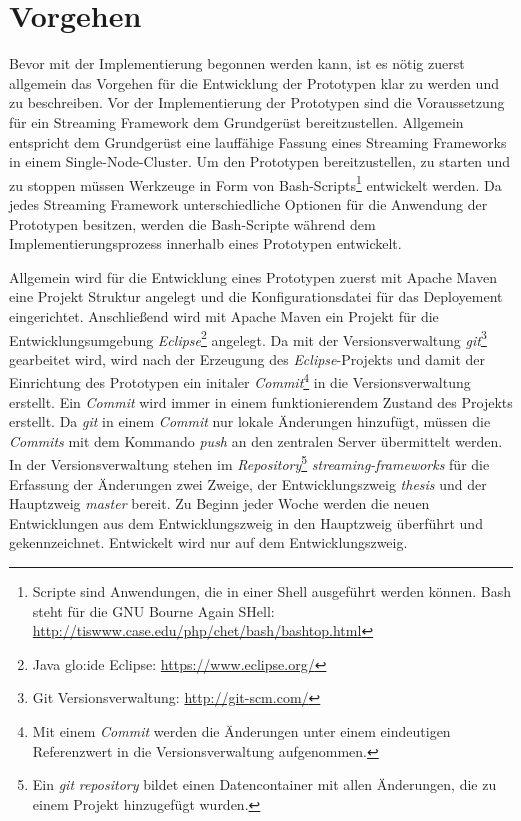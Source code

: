 \section{Vorgehen}
\label{sec:vorgehen}

Bevor mit der Implementierung begonnen werden kann, ist es nötig zuerst allgemein das Vorgehen für die Entwicklung der Prototypen klar zu werden und zu beschreiben. Vor der Implementierung der Prototypen sind die Voraussetzung für ein Streaming Framework dem Grundgerüst bereitzustellen. Allgemein entspricht dem Grundgerüst eine lauffähige Fassung eines Streaming Frameworks in einem Single-Node-Cluster. Um den Prototypen bereitzustellen, zu starten und zu stoppen müssen Werkzeuge in Form von Bash-Scripts\footnote{Scripte sind Anwendungen, die in einer Shell ausgeführt werden können. Bash steht für die GNU Bourne Again SHell: \url{http://tiswww.case.edu/php/chet/bash/bashtop.html}} entwickelt werden. Da jedes Streaming Framework unterschiedliche Optionen für die Anwendung der Prototypen besitzen, werden die Bash-Scripte während dem Implementierungsprozess innerhalb eines Prototypen entwickelt.

Allgemein wird für die Entwicklung eines Prototypen zuerst mit Apache Maven eine Projekt Struktur angelegt und die Konfigurationsdatei für das Deployement eingerichtet. Anschließend wird mit Apache Maven ein Projekt für die Entwicklungsumgebung \textit{Eclipse}\footnote{Java \gls{glo:ide} Eclipse: \url{https://www.eclipse.org/}} angelegt. Da mit der Versionsverwaltung \textit{git}\footnote{Git Versionsverwaltung: \url{http://git-scm.com/}} gearbeitet wird, wird nach der Erzeugung des \textit{Eclipse}-Projekts und damit der Einrichtung des Prototypen ein initaler \textit{Commit}\footnote{Mit einem \textit{Commit} werden die Änderungen unter einem eindeutigen Referenzwert in die Versionsverwaltung aufgenommen.} in die Versionsverwaltung erstellt. Ein \textit{Commit} wird immer in einem funktionierendem Zustand des Projekts erstellt. Da \textit{git} in einem \textit{Commit} nur lokale Änderungen hinzufügt, müssen die \textit{Commits} mit dem Kommando \textit{push} an den zentralen Server übermittelt werden. In der Versionsverwaltung stehen im \textit{Repository}\footnote{Ein \textit{git} \textit{repository} bildet einen Datencontainer mit allen Änderungen, die zu einem Projekt hinzugefügt wurden.} \textit{streaming-frameworks} für die Erfassung der Änderungen zwei Zweige, der Entwicklungszweig \textit{thesis} und der Hauptzweig \textit{master} bereit. Zu Beginn jeder Woche werden die neuen Entwicklungen aus dem Entwicklungszweig in den Hauptzweig überführt und gekennzeichnet. Entwickelt wird nur auf dem Entwicklungszweig.

